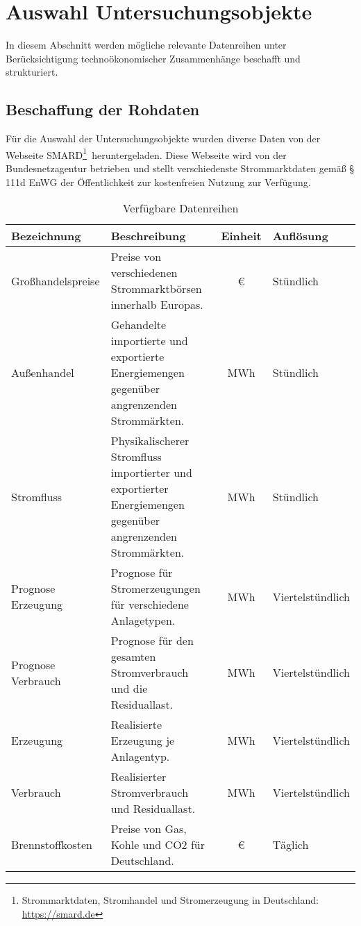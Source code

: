 \section{Auswahl Untersuchungsobjekte}
In diesem Abschnitt werden mögliche relevante Datenreihen unter Berücksichtigung technoökonomischer Zusammenhänge beschafft und strukturiert.

\subsection{Beschaffung der Rohdaten}
Für die Auswahl der Untersuchungsobjekte wurden diverse Daten von der Webseite SMARD\footnote{Strommarktdaten, Stromhandel und Stromerzeugung in Deutschland: \url{https://smard.de}} heruntergeladen. Diese Webseite wird von der Bundesnetzagentur betrieben und stellt verschiedenste Strommarktdaten gemäß § 111d EnWG  der Öffentlichkeit zur kostenfreien Nutzung zur Verfügung.

\begin{table}[h]
  \centering
  \begin{tabularx}{\textwidth}{|l|X|c|l|}
    \hline

    \textbf{Bezeichnung} & \textbf{Beschreibung} & \textbf{Einheit} & \textbf{Auflösung} \\ \hline
    
    Großhandelspreise & Preise von verschiedenen Strommarktbörsen innerhalb Europas. & € & Stündlich \\ \hline

    Außenhandel & Gehandelte importierte und exportierte Energiemengen gegenüber angrenzenden Strommärkten. & MWh & Stündlich \\ \hline

    Stromfluss & Physikalischerer Stromfluss importierter und exportierter Energiemengen gegenüber angrenzenden Strommärkten. & MWh & Stündlich \\ \hline

    Prognose Erzeugung & Prognose für Stromerzeugungen für verschiedene Anlagetypen. & MWh & Viertelstündlich \\ \hline

    Prognose Verbrauch & Prognose für den gesamten Stromverbrauch und die Residuallast. & MWh & Viertelstündlich \\ \hline

    Erzeugung & Realisierte Erzeugung je Anlagentyp. & MWh & Viertelstündlich \\ \hline

    Verbrauch & Realisierter Stromverbrauch und Residuallast. & MWh & Viertelstündlich \\ \hline

    Brennstoffkosten & Preise von Gas, Kohle und CO2 für Deutschland. & € & Täglich \\ \hline
  \end{tabularx}
  \caption{Verfügbare Datenreihen}
\end{table}

